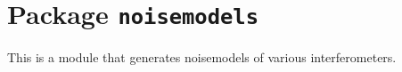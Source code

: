 \chapter{Package \texttt{noisemodels}}

This is a module that generates noisemodels of various
interferometers.
 
\newpage
